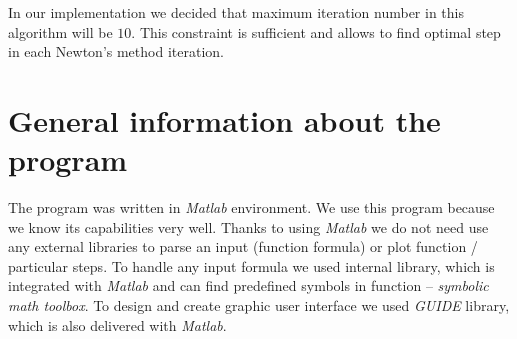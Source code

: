 \documentclass[12pt]{article}
\begin{document}
In our implementation we decided that maximum iteration number in this algorithm will be $10$. This constraint is sufficient and allows to find optimal step in each Newton's method iteration.

\section{General information about the program}
The program was written in \textit{Matlab} environment. We use this program because we know its capabilities very well. Thanks to using \textit{Matlab} we do not need use any external libraries to parse an input (function formula) or plot function / particular steps. To handle any input formula we used internal library, which is integrated with \textit{Matlab} and can find predefined symbols in function -- \textit{symbolic math toolbox}. To design and create graphic user interface we used \textit{GUIDE} library, which is also delivered with \textit{Matlab}.
\end{document}
